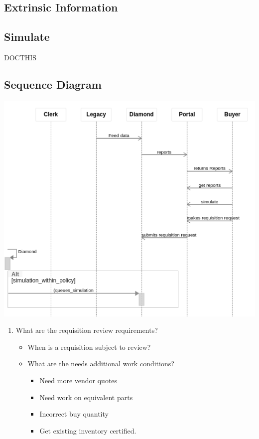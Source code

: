 \documentclass[letterpaper,10pt,english]{sphinxmanual}
\begin{document}
\subsection{Extrinsic Information}
\label{Portal/750-Requisitions:extrinsic-information}

\subsection{Simulate}
\label{Portal/750-Requisitions:simulate}
DOCTHIS


\subsection{Sequence Diagram}
\label{Portal/750-Requisitions:sequence-diagram}
\includegraphics{Requisitions.png}
\begin{enumerate}
\item {} 
What are the requisition review requirements?
\begin{itemize}
\item {} 
When is a requisition subject to review?

\item {} 
What are the needs additional work conditions?
\begin{itemize}
\item {} 
Need more vendor quotes

\item {} 
Need work on equivalent parts

\item {} 
Incorrect buy quantity

\item {} 
Get existing inventory certified.

\end{itemize}

\end{itemize}

\end{enumerate}
\end{document}
